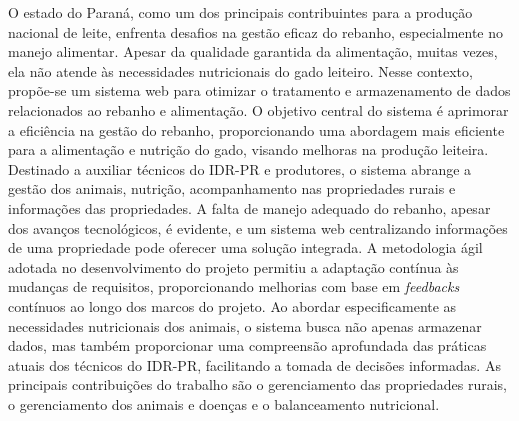 
\begin{resumoutfpr}%
  O estado do Paraná, como um dos principais contribuintes para a produção nacional de leite, enfrenta desafios na gestão eficaz do rebanho, especialmente no manejo alimentar. Apesar da qualidade garantida da alimentação, muitas vezes, ela não atende às necessidades nutricionais do gado leiteiro. Nesse contexto, propõe-se um sistema web para otimizar o tratamento e armazenamento de dados relacionados ao rebanho e alimentação. O objetivo central do sistema é aprimorar a eficiência na gestão do rebanho, proporcionando uma abordagem mais eficiente para a alimentação e nutrição do gado, visando melhoras na produção leiteira. Destinado a auxiliar técnicos do \gls{IDR-PR} e produtores, o sistema abrange a gestão dos animais, nutrição, acompanhamento nas propriedades rurais e informações das propriedades. A falta de manejo adequado do rebanho, apesar dos avanços tecnológicos, é evidente, e um sistema web centralizando informações de uma propriedade pode oferecer uma solução integrada. A metodologia ágil adotada no desenvolvimento do projeto permitiu a adaptação contínua às mudanças de requisitos, proporcionando melhorias com base em \textit{feedbacks} contínuos ao longo dos marcos do projeto. Ao abordar especificamente as necessidades nutricionais dos animais, o sistema busca não apenas armazenar dados, mas também proporcionar uma compreensão aprofundada das práticas atuais dos técnicos do \gls{IDR-PR}, facilitando a tomada de decisões informadas. As principais contribuições do trabalho são o gerenciamento das propriedades rurais, o gerenciamento dos animais e doenças e o balanceamento nutricional.
\end{resumoutfpr}
